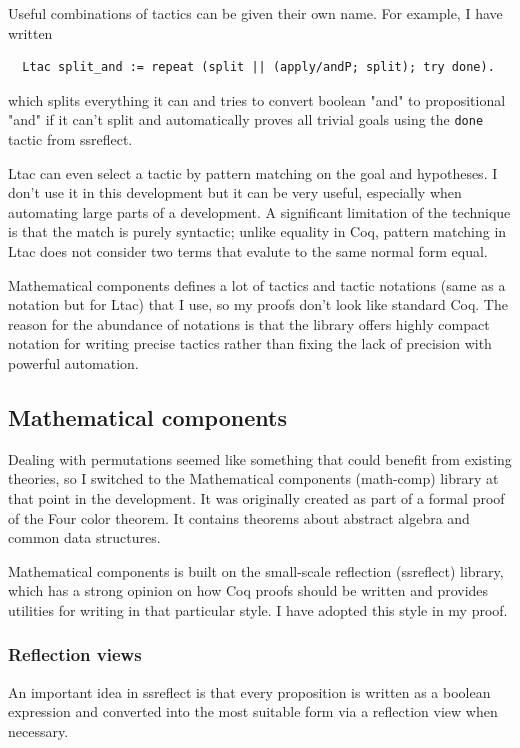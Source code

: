 \documentclass[english, 12pt, a4paper, sci, a-1b, online]{aaltothesis}
\newcommand\icoq[1]{\texttt{#1}}
\begin{document}
Useful combinations of tactics can be given their own name. For example, I have written
\begin{verbatim}
  Ltac split_and := repeat (split || (apply/andP; split); try done).
\end{verbatim}
which splits everything it can and tries to convert boolean "and" to propositional "and" if it can't split and automatically proves all trivial goals using the \icoq{done} tactic from ssreflect.

Ltac can even select a tactic by pattern matching on the goal and hypotheses. I don't use it in this development but it can be very useful, especially when automating large parts of a development. A significant limitation of the technique is that the match is purely syntactic; unlike equality in Coq, pattern matching in Ltac does not consider two terms that evalute to the same normal form equal.

Mathematical components defines a lot of tactics and tactic notations (same as a notation but for Ltac) that I use, so my proofs don't look like standard Coq. The reason for the abundance of notations is that the library offers highly compact notation for writing precise tactics rather than fixing the lack of precision with powerful automation.

\subsection{Mathematical components}

Dealing with permutations seemed like something that could benefit from existing theories, so I switched to the Mathematical components (math-comp) library at that point in the development. It was originally created as part of a formal proof of the Four color theorem. It contains theorems about abstract algebra and common data structures.

Mathematical components is built on the small-scale reflection (ssreflect) library, which has a strong opinion on how Coq proofs should be written and provides utilities for writing in that particular style. I have adopted this style in my proof.

\subsubsection{Reflection views}

An important idea in ssreflect is that every proposition is written as a boolean expression and converted into the most suitable form via a reflection view when necessary.~\cite{mathcompbook}
\end{document}
